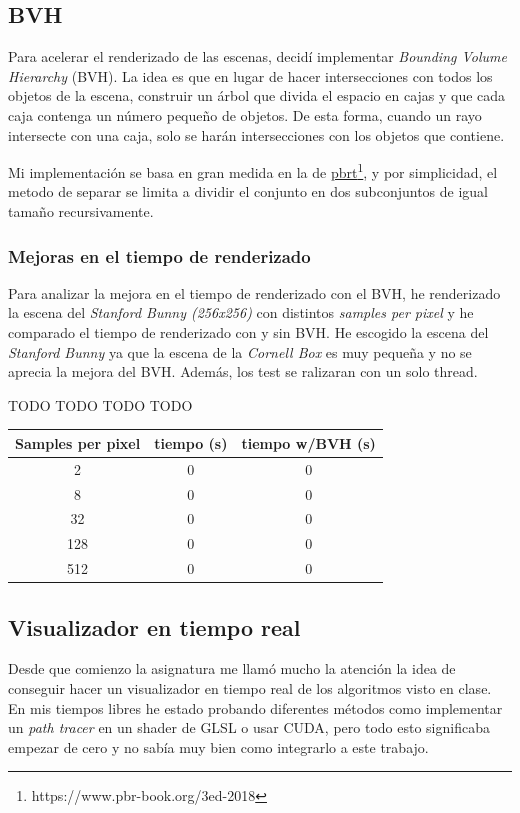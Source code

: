 \documentclass{article}
\begin{document}
\subsection{BVH}
Para acelerar el renderizado de las escenas, decidí implementar \textit{Bounding
  Volume Hierarchy} (BVH). La idea es que en lugar de hacer intersecciones con
todos los objetos de la escena, construir un árbol que divida el espacio en
cajas y que cada caja contenga un número pequeño de objetos. De esta forma,
cuando un rayo intersecte con una caja, solo se harán intersecciones con los
objetos que contiene.

Mi implementación se basa en gran medida en la de
\href{https://www.pbr-book.org/3ed-2018/Primitives_and_Intersection_Acceleration/Bounding_Volume_Hierarchies}{pbrt}\footnote{https://www.pbr-book.org/3ed-2018},
y por simplicidad, el metodo de separar se limita a dividir el conjunto en dos
subconjuntos de igual tamaño recursivamente.

\subsubsection{Mejoras en el tiempo de renderizado}

Para analizar la mejora en el tiempo de renderizado con el BVH, he renderizado
la escena del \textit{Stanford Bunny (256x256)} con distintos \textit{samples
  per pixel} y he comparado el tiempo de renderizado con y sin BVH. He escogido
la escena del \textit{Stanford Bunny} ya que la escena de la \textit{Cornell
  Box} es muy pequeña y no se aprecia la mejora del BVH. Además, los test se
ralizaran con un solo thread.

TODO TODO TODO TODO 

\begin{center}
\begin{tabular}{||c c c||}
 \hline
 Samples per pixel & tiempo (s) & tiempo w/BVH (s) \\ [0.5ex]
 \hline\hline
 2 & 0 & 0 \\
 \hline
 8 & 0 & 0 \\
 \hline
 32 & 0 & 0 \\
 \hline
 128 & 0 & 0 \\
 \hline
 512 & 0 & 0 \\ [1ex]
 \hline
\end{tabular}
\end{center}

\subsection{Visualizador en tiempo real}
Desde que comienzo la asignatura me llamó mucho la atención la idea de conseguir hacer un visualizador en tiempo real de los algoritmos visto en clase. En mis tiempos libres he estado probando diferentes métodos como implementar un \textit{path tracer} en un shader de GLSL o usar CUDA, pero todo esto significaba empezar de cero y no sabía muy bien como integrarlo a este trabajo.
\end{document}
